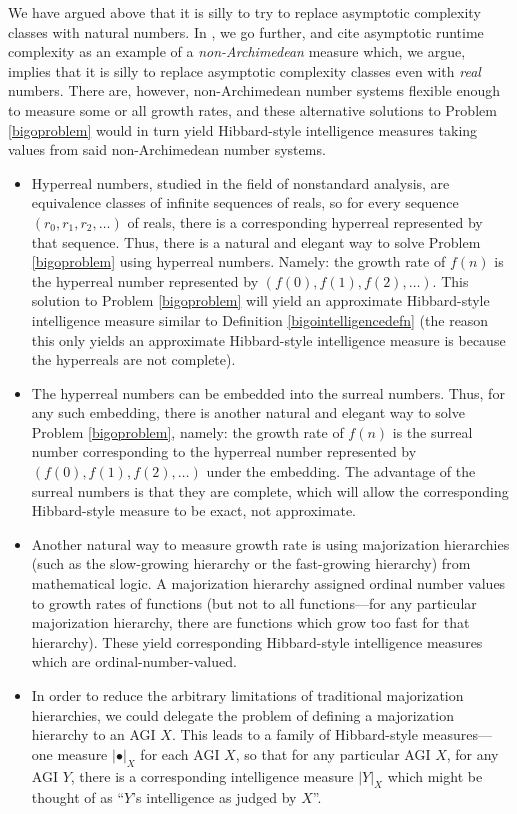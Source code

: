 \documentclass{article}
\begin{document}
We have argued above that it is silly to try to replace asymptotic complexity classes
with natural numbers. In \cite{alexander2020archimedean}, we go further, and cite
asymptotic runtime complexity as an example of a \emph{non-Archimedean} measure which,
we argue, implies that it is silly to replace asymptotic complexity classes
even with \emph{real} numbers. There are, however, non-Archimedean number systems
flexible enough to measure some or all growth rates, and these alternative solutions to
Problem \ref{bigoproblem} would in turn yield Hibbard-style intelligence measures taking
values from said non-Archimedean number systems.
\begin{itemize}
    \item
    Hyperreal numbers, studied in the field of nonstandard analysis,
    are equivalence classes of infinite sequences of reals,
    so for every sequence $(r_0,r_1,r_2,\ldots)$ of reals, there is a corresponding
    hyperreal represented by that sequence.
    Thus, there is a natural and elegant way to solve Problem \ref{bigoproblem}
    using hyperreal numbers. Namely: the growth rate of $f(n)$ is the hyperreal number
    represented by $(f(0),f(1),f(2),\ldots)$. This solution to Problem \ref{bigoproblem}
    will yield an approximate Hibbard-style intelligence measure similar to
    Definition \ref{bigointelligencedefn} (the reason this only yields an approximate
    Hibbard-style intelligence measure is because the hyperreals are not complete).
    \item
    The hyperreal numbers can be embedded into the surreal numbers.
    Thus, for any such embedding,
    there is another natural and elegant way to solve Problem \ref{bigoproblem},
    namely: the growth rate of $f(n)$ is the surreal number corresponding to the
    hyperreal number represented by $(f(0),f(1),f(2),\ldots)$ under the embedding.
    The advantage of the surreal numbers is that they are complete, which will allow
    the corresponding Hibbard-style measure to be exact, not approximate.
    \item
    Another natural way to measure growth rate is using majorization hierarchies
    (such as the slow-growing hierarchy or the fast-growing hierarchy) from mathematical
    logic. A majorization hierarchy assigned ordinal number values to growth rates of
    functions (but not to all functions---for any particular majorization hierarchy, there
    are functions which grow too fast for that hierarchy). These yield corresponding
    Hibbard-style intelligence measures which are ordinal-number-valued.
    \item
    In order to reduce the arbitrary limitations of traditional majorization
    hierarchies, we could delegate the problem of defining a majorization hierarchy to
    an AGI $X$. This leads to a family of Hibbard-style measures---one measure
    $|\bullet|_X$ for each AGI $X$, so that for any particular AGI $X$, for any
    AGI $Y$, there is a corresponding intelligence measure $|Y|_X$ which might be
    thought of as ``$Y$'s intelligence as judged by $X$''.
\end{itemize}
\end{document}
